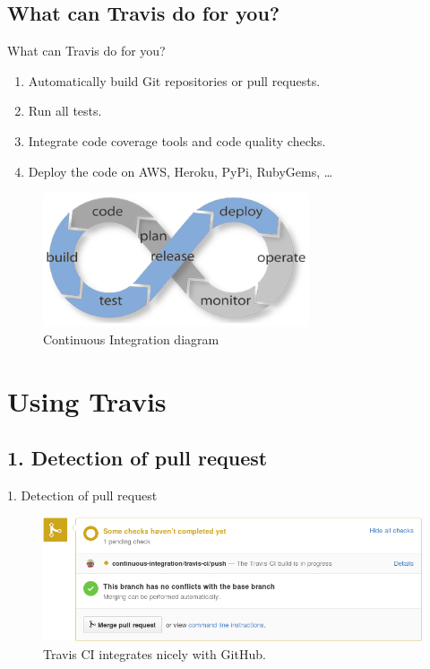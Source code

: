 \documentclass[xcolor=x11names,compress,t]{beamer}
\renewcommand{\(}{\begin{columns}[T]}
\renewcommand{\)}{\end{columns}}
\newcommand{\<}[1]{\begin{column}{#1}}
\renewcommand{\>}{\end{column}}
\newenvironment{slide}[1]{\subsection{#1} \begin{frame}{#1}}{\end{frame}}
\begin{document}
\begin{slide}{What can Travis do for you?}
\begin{enumerate}
	\item Automatically build Git repositories or pull requests.
    \item Run all tests.
    \item Integrate code coverage tools and code quality checks.
    \item Deploy the code on AWS, Heroku, PyPi, RubyGems, \dots
\end{enumerate}
\begin{figure}[htb]
    \centering
    \includegraphics[width=0.7\textwidth]{ci-travis-parts}
    \caption{Continuous Integration diagram}
\end{figure}
\end{slide}

\section{Using Travis}
\begin{slide}{1. Detection of pull request}
\begin{figure}[htb]
    \centering
    \includegraphics[width=\textwidth]{detection-github}
    \caption{Travis CI integrates nicely with GitHub.}
\end{figure}
\end{slide}
\end{document}
